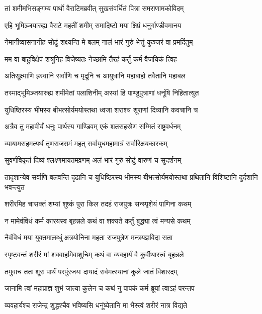 \twolineshloka
{तां शमीमभिसङ्गम्य पार्थो वैराटिमब्रवीत्}
{सुखसंवर्धितं पित्रा समराणामकोविदम्}


\twolineshloka
{एहि भूमिञ्जयारुह्य वैराटे महतीं शमीम्}
{समादिष्टो मया क्षिप्रं धनुर्गाण्डीवमानय}


\twolineshloka
{नेमानीष्वासनानीह सोढुं शक्ष्यन्ति मे बलम्}
{नालं भारं गुरुं भेत्तुं कुञ्जरं वा प्रमर्दितुम्}


\twolineshloka
{मम वा बाहुविक्षेपं शत्रूनिह विजेष्यतः}
{नेच्छामि तैरहं कर्तुं कर्म वैजयिकं त्विह}


\twolineshloka
{अतिसूक्ष्माणि ह्रस्वानि सर्वाणि च मृदूनि च}
{आयुधानि महाबाहो तवैतानि महाबल}


\twolineshloka
{तस्माद्भूमिञ्जयारुह्य शमीमेतां पलाशिनीम्}
{अस्यां हि पाण्डुपुत्राणां धनूंषि निहितात्युत}


\twolineshloka
{युधिष्ठिरस्य भीमस्य बीभत्सोर्यमयोस्तथा}
{ध्वजा शराश्च शूराणां दिव्यानि कवचानि च}


\twolineshloka
{अत्रैव तु महावीर्यं धनुः पार्थस्य गाण्डिवम्}
{एकं शतसहस्रेण सम्मितं राष्ट्रवर्धनम्}


\twolineshloka
{व्यायामसहमत्यर्थं तृणराजसमं महत्}
{सर्वायुधमहामात्रं सर्वारिक्षयकारकम्}


\twolineshloka
{सुवर्णविकृतं दिव्यं श्लक्ष्णमायतमव्रणम्}
{अलं भारं गुरुं सोढुं वारुणं च सुदर्शनम्}


\threelineshloka
{तादृशान्येव सर्वाणि बलवन्ति दृढानि च}
{युधिष्ठिरस्य भीमस्य बीभत्सोर्यमयोस्तथा}
{प्रथितानि विशिष्टानि दुर्दशानि भवन्त्युत}




\twolineshloka
{शरीरमिह चासक्तं शम्यां शुष्कं पुरा किल}
{तदहं राजपुत्रः सन्स्पृशेयं पाणिना कथम्}


\twolineshloka
{न मामेवंविधं कर्म कारयस्व बृहन्नले}
{कथं वा शक्यते कर्तुं बुद्ध्या त्वं मन्यसे कथम्}


\twolineshloka
{नैवंविधं मया युक्तमालब्धुं क्षत्रयोनिना}
{महता राजपुत्रेण मन्त्रयज्ञविदा सता}


\twolineshloka
{स्पृष्टवन्तं शरीरं मां शववाहमिवाशुचिम्}
{कथं वा व्यवहार्यं वै कुर्वीथास्त्वं बृहन्नले}



\twolineshloka
{तमुवाच ततः शूरः पार्थं परपुंरजयः}
{दायादं सर्वमत्स्यानां कुले जातं विशारदम्}


\twolineshloka
{जानामि त्वां महाप्राज्ञ शुभं जात्या कुलेन च}
{कथं नु पापकं कर्म ब्रूयां त्वाऽहं परन्तप}


\twolineshloka
{व्यवहार्यश्च राजेन्द्र शुद्धश्चैव भविष्यसि}
{धनूंष्येतानि मा भैस्त्वं शरीरं नात्र विद्यते}


